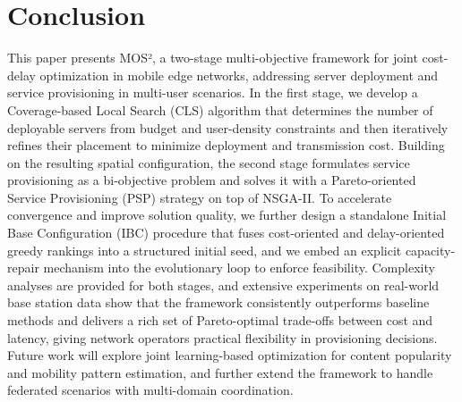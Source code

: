 \documentclass[10pt, conference, letterpaper]{IEEEtran}
\begin{document}
\section{Conclusion}
 This paper presents MOS², a two-stage multi-objective framework for joint cost-delay optimization in mobile edge networks,
   addressing server deployment and service provisioning in multi-user scenarios. In the first stage, we develop a
  Coverage-based Local Search (CLS) algorithm that determines the number of deployable servers from budget and user-density
  constraints and then iteratively refines their placement to minimize deployment and transmission cost. Building on the
  resulting spatial configuration, the second stage formulates service provisioning as a bi-objective problem and solves it
  with a Pareto-oriented Service Provisioning (PSP) strategy on top of NSGA-II. To accelerate convergence and improve
  solution quality, we further design a standalone Initial Base Configuration (IBC) procedure that fuses cost-oriented and
  delay-oriented greedy rankings into a structured initial seed, and we embed an explicit capacity-repair mechanism into the
   evolutionary loop to enforce feasibility. Complexity analyses are provided for both stages, and extensive experiments on
  real-world base station data show that the framework consistently outperforms baseline methods and delivers a rich set of
  Pareto-optimal trade-offs between cost and latency, giving network operators practical flexibility in provisioning
  decisions. Future work will explore joint learning-based optimization for content popularity and mobility pattern estimation, and further extend the framework to handle federated scenarios with multi-domain coordination. 

\end{document}
